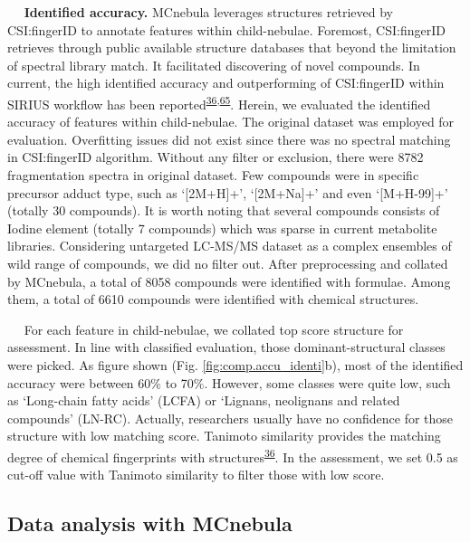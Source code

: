    \textbf{Identified accuracy.} MCnebula leverages structures retrieved
by CSI:fingerID to annotate features within child-nebulae. Foremost,
CSI:fingerID retrieves through public available structure databases that
beyond the limitation of spectral library match. It facilitated
discovering of novel compounds. In current, the high identified accuracy
and outperforming of CSI:fingerID within SIRIUS workflow has been
reported\textsuperscript{\protect\hyperlink{ref-2019}{36},\protect\hyperlink{ref-2021}{65}}.
Herein, we evaluated the identified accuracy of features within
child-nebulae. The original dataset was employed for evaluation.
Overfitting issues did not exist since there was no spectral matching in
CSI:fingerID algorithm. Without any filter or exclusion, there were 8782
fragmentation spectra in original dataset. Few compounds were in
specific precursor adduct type, such as `{[}2M+H{]}+', `{[}2M+Na{]}+'
and even `{[}M+H-99{]}+' (totally 30 compounds). It is worth noting that
several compounds consists of Iodine element (totally 7 compounds) which
was sparse in current metabolite libraries. Considering untargeted
LC-MS/MS dataset as a complex ensembles of wild range of compounds, we
did no filter out. After preprocessing and collated by MCnebula, a total
of 8058 compounds were identified with formulae. Among them, a total of
6610 compounds were identified with chemical structures.

   For each feature in child-nebulae, we collated top score structure
for assessment. In line with classified evaluation, those
dominant-structural classes were picked. As figure shown (Fig.
{\protect\NoHyper\ref{fig:comp.accu_identi}\protect\endNoHyper}b), most
of the identified accuracy were between 60\% to 70\%. However, some
classes were quite low, such as `Long-chain fatty acids' (LCFA) or
`Lignans, neolignans and related compounds' (LN-RC). Actually,
researchers usually have no confidence for those structure with low
matching score. Tanimoto similarity provides the matching degree of
chemical fingerprints with
structures\textsuperscript{\protect\hyperlink{ref-2019}{36}}. In the
assessment, we set 0.5 as cut-off value with Tanimoto similarity to
filter those with low score.

\hypertarget{data-analysis-with-mcnebula}{%
\subsection{\texorpdfstring{\textbf{Data analysis with
MCnebula}}{Data analysis with MCnebula}}\label{data-analysis-with-mcnebula}}

